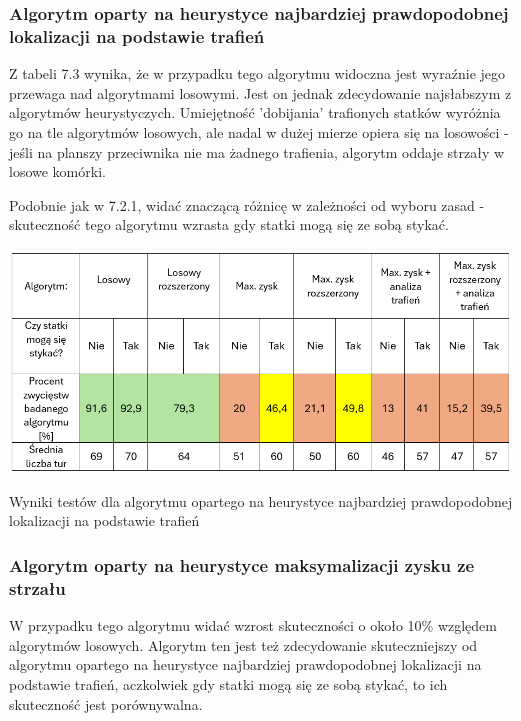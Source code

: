 \subsubsection{Algorytm oparty na heurystyce najbardziej prawdopodobnej lokalizacji na podstawie trafień}

Z tabeli 7.3 wynika, że w przypadku tego algorytmu widoczna jest wyraźnie jego przewaga nad algorytmami losowymi. Jest on jednak zdecydowanie najsłabszym z algorytmów heurystyczych. Umiejętność 'dobijania' trafionych statków wyróżnia go na tle algorytmów losowych, ale nadal w dużej mierze opiera się na losowości - jeśli na planszy przeciwnika nie ma żadnego trafienia, algorytm oddaje strzały w losowe komórki.

Podobnie jak w 7.2.1, widać znaczącą różnicę w zależności od wyboru zasad - skuteczność tego algorytmu wzrasta gdy statki mogą się ze sobą stykać.

\begin{table}[!h]
    \centering
    \includegraphics[width=1\linewidth]{img/table-hit-heuristic.png}
    \caption{Wyniki testów dla algorytmu opartego na heurystyce najbardziej prawdopodobnej lokalizacji na podstawie trafień}
\end{table}

\subsubsection{Algorytm oparty na heurystyce maksymalizacji zysku ze strzału}

W przypadku tego algorytmu widać wzrost skuteczności o około 10\% względem algorytmów losowych. Algorytm ten jest też zdecydowanie skuteczniejszy od algorytmu opartego na heurystyce najbardziej prawdopodobnej lokalizacji na podstawie trafień, aczkolwiek gdy statki mogą się ze sobą stykać, to ich skuteczność jest porównywalna.

